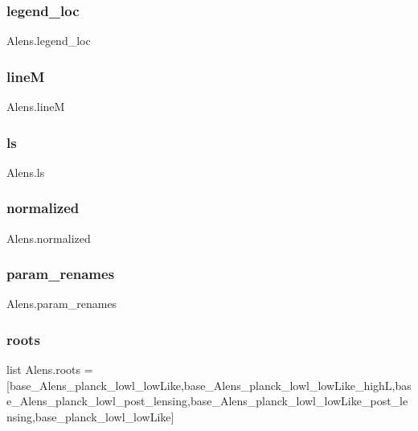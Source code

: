 \subsubsection{\texorpdfstring{legend\+\_\+loc}{legend\_loc}}
{\footnotesize\ttfamily Alens.\+legend\+\_\+loc}

\mbox{\label{namespaceAlens_a20a2d54d444c9d2a0c3028de50ec088c}} 
\subsubsection{\texorpdfstring{lineM}{lineM}}
{\footnotesize\ttfamily Alens.\+lineM}

\mbox{\label{namespaceAlens_ac994dbf7e15439925a9faf3b06586e04}} 
\subsubsection{\texorpdfstring{ls}{ls}}
{\footnotesize\ttfamily Alens.\+ls}

\mbox{\label{namespaceAlens_ae5ca2d017ddd94ef34171b2a3a7e0217}} 
\subsubsection{\texorpdfstring{normalized}{normalized}}
{\footnotesize\ttfamily Alens.\+normalized}

\mbox{\label{namespaceAlens_a7a7b9e42bdac514c808bafe79bae1ffe}} 
\subsubsection{\texorpdfstring{param\+\_\+renames}{param\_renames}}
{\footnotesize\ttfamily Alens.\+param\+\_\+renames}

\mbox{\label{namespaceAlens_a153a8685dae4e7bca589dcd5ab3570c5}} 
\subsubsection{\texorpdfstring{roots}{roots}}
{\footnotesize\ttfamily list Alens.\+roots = \mbox{[}\textquotesingle{}base\+\_\+\+Alens\+\_\+planck\+\_\+lowl\+\_\+low\+Like\textquotesingle{},\textquotesingle{}base\+\_\+\+Alens\+\_\+planck\+\_\+lowl\+\_\+low\+Like\+\_\+highL\textquotesingle{},\textquotesingle{}base\+\_\+\+Alens\+\_\+planck\+\_\+lowl\+\_\+post\+\_\+lensing\textquotesingle{},\textquotesingle{}base\+\_\+\+Alens\+\_\+planck\+\_\+lowl\+\_\+low\+Like\+\_\+post\+\_\+lensing\textquotesingle{},\textquotesingle{}base\+\_\+planck\+\_\+lowl\+\_\+low\+Like\textquotesingle{}\mbox{]}}

